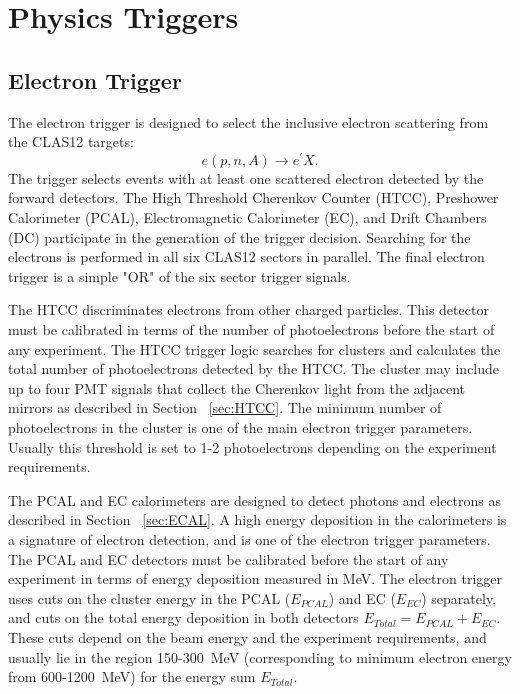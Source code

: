 
\section{Physics Triggers}
\label{sec:physics_triggers}


\subsection{Electron Trigger}
\label{sec:electron_trigger}

The electron trigger is designed to select the inclusive electron scattering from the CLAS12 targets:
\begin{equation}
e(p,n,A)\rightarrow e^\prime X.
\label{eqn:electron}
\end{equation}
\noindent
The trigger  selects  events with at least one scattered electron detected by the forward detectors. The High Threshold Cherenkov Counter (HTCC),  Preshower Calorimeter (PCAL),  Electromagnetic Calorimeter (EC), and Drift Chambers (DC) participate in the generation of the trigger decision. Searching for the electrons is performed  in all six CLAS12 sectors in parallel. The final electron trigger is  a simple "OR" of the six sector trigger signals.

The HTCC discriminates electrons from other charged particles. This detector must be calibrated in terms of the number of photoelectrons before the start of any experiment. The HTCC trigger logic  searches for clusters and calculates the total number of  photoelectrons  detected by the HTCC. The cluster may include up to four PMT signals that collect the Cherenkov light from the adjacent mirrors as described in Section ~\ref{sec:HTCC}. The minimum number of  photoelectrons in the cluster  is one of the main electron trigger parameters. Usually this threshold is set to 1-2 photoelectrons depending on the experiment requirements.

The PCAL and EC calorimeters are designed to detect photons and electrons as described in Section ~\ref{sec:ECAL}. A high energy deposition in the calorimeters is a signature of electron detection, and is one of the electron trigger parameters. The PCAL and EC detectors must be calibrated before the start of any experiment in terms of energy deposition measured in MeV. The electron trigger uses cuts on the cluster energy in the PCAL ($E_{PCAL}$) and EC ($E_{EC}$) separately, and cuts on the total energy deposition in both detectors $E_{Total}=E_{PCAL}+E_{EC}$.
These cuts   depend  on the beam energy and the experiment requirements, and usually lie in the region  150-300~MeV (corresponding to minimum electron energy from 600-1200~MeV) for the energy sum $E_{Total}$.

